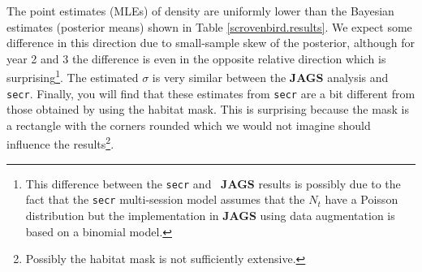 The point estimates (MLEs) of density are uniformly lower than the Bayesian estimates
(posterior means)
shown in Table \ref{scrovenbird.results}.
We expect some difference in this direction due to
small-sample skew of the posterior, although for year 2 and 3 the
difference is even in the opposite relative direction which is
surprising\footnote{This difference between the \mbox{\tt secr} and \mbox{\bf
  JAGS} results is possibly due to the fact that the \mbox{\tt secr}
multi-session 
model assumes that the $N_{t}$ have a Poisson distribution but the
implementation in {\bf JAGS} using data augmentation is based on a
binomial model.}.
The estimated $\sigma$ is very similar between the {\bf JAGS}
analysis and \mbox{\tt secr}.
Finally, you will find that these estimates from \mbox{\tt secr}
 are a bit different from those obtained by
using the habitat mask. This is surprising because the mask
is a rectangle with the corners
rounded which we would not imagine should influence the results\footnote{
Possibly the habitat mask is not sufficiently extensive.}.



